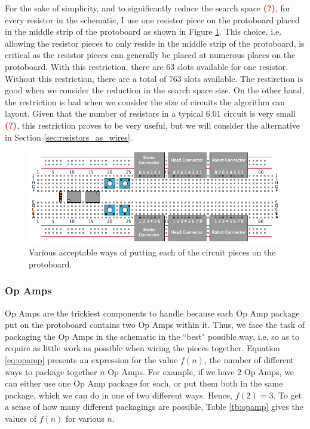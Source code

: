 For the sake of simplicity, and to significantly reduce the search space
\textcolor{red}{\textbf{(?)}}, for every resistor in the schematic, I use one
resistor piece on the protoboard placed in the middle strip of the protoboard
as shown in Figure \ref{fig:piece_placement}. This choice, i.e. allowing the
resistor pieces to only reside in the middle strip of the protoboard, is critical
as the resistor pieces can generally be placed at numerous places on the
protoboard.
With this restriction, there are $63$ slots available for one resistor. Without
this restriction, there are a total of $763$ slots available. The restirction is
good when we consider the reduction in the search space size. On the other hand,
the restriction is bad when we
consider the size of circuits the algorithm can layout. Given that the number
of resistors in a typical 6.01 circuit is very
small \textcolor{red}{\textbf{(?)}}, this restriction proves
to be very useful, but we will consider the alternative in Section
\ref{sec:resistors_as_wires}.

\begin{figure}
\begin{center}
\includegraphics[width=\linewidth]{Images/piece_placement_options.png}
\caption{Various acceptable ways of putting each of the circuit pieces on the
protoboard.}
\label{fig:piece_placement}
\end{center}
\end{figure}

\subsubsection{Op Amps}

Op Amps are the trickiest components to handle because each Op Amp package put
on the protoboard contains two Op Amps within it. Thus, we face the task of
packaging the Op Amps in the schematic in the ``best" possible way, i.e. so as
to require as little work as possible when wiring the pieces together. Equation
\ref{eq:opamp} presents an expression for the value $f(n)$, the number of
different ways to package together $n$ Op Amps. For example, if we have $2$ Op
Amps, we can either use one Op Amp package for each, or put them both in the
same package, which we can do in one of two different ways. Hence, $f(2) = 3$.
To get a sense of how many different packagings are possible, Table
\ref{tb:opamp} gives the values of $f(n)$ for various $n$.

